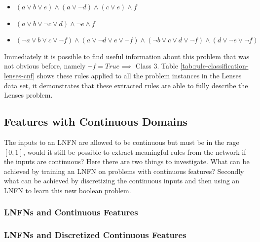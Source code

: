 \begin{itemize}
	\item {} $(a \lor b \lor e) \land (a \lor \lnot d) \land (c \lor e) \land f$
	\item {} $(a \lor b \lor \lnot c \lor d) \land \lnot e \land f$
	\item {} $(\lnot a \lor b \lor c \lor \lnot f) \land (a \lor \lnot d \lor e \lor \lnot f) \land (\lnot b \lor c \lor d \lor \lnot f) \land (d \lor \lnot e \lor \lnot f)$
\end{itemize}

Immediately it is possible to find useful information about this problem that was not obvious before, namely $\lnot f = True \implies $ Class 3. Table \ref{tab:rule-classification-lenses-cnf} shows these rules applied to all the problem instances in the Lenses data set, it demonstrates that these extracted rules are able to fully describe the Lenses problem.

\subsection{Features with Continuous Domains}
The inputs to an LNFN are allowed to be continuous but must be in the rage $[0, 1]$, would it still be possible to extract meaningful rules from the network if the inputs are continuous? Here there are two things to investigate. What can be achieved by training an LNFN on problems with continuous features? Secondly what can be achieved by discretizing the continuous inputs and then using an LNFN to learn this new boolean problem. 

\subsubsection{LNFNs and Continuous Features}
\subsubsection{LNFNs and Discretized Continuous Features}